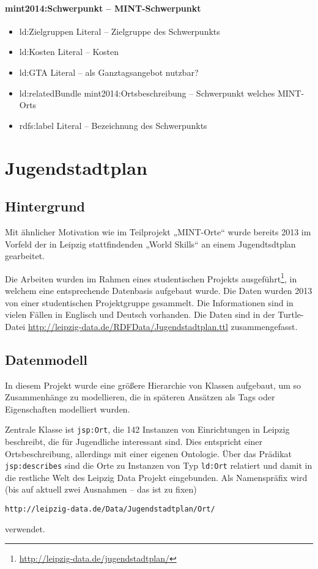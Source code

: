 \documentclass[a4paper,11pt]{article}
\begin{document}
\paragraph{mint2014:Schwerpunkt – MINT-Schwerpunkt}
\begin{itemize}\itemsep0pt
\item ld:Zielgruppen Literal – Zielgruppe des Schwerpunkts
\item ld:Kosten Literal – Kosten
\item ld:GTA Literal – als Ganztagsangebot nutzbar?
\item ld:relatedBundle mint2014:Ortsbeschreibung – Schwerpunkt welches
  MINT-Orts
\item rdfs:label Literal – Bezeichnung des Schwerpunkts
\end{itemize}
\newpage

\section{Jugendstadtplan}

\subsection{Hintergrund}
Mit ähnlicher Motivation wie im Teilprojekt „MINT-Orte“ wurde bereits 2013 im
Vorfeld der in Leipzig stattfindenden „World Skills“ an einem Jugendtsdtplan
gearbeitet. 

Die Arbeiten wurden im Rahmen eines studentischen Projekts
ausgeführt\footnote{\url{http://leipzig-data.de/jugendstadtplan/}}, in welchem
eine entsprechende Datenbasis aufgebaut wurde. Die Daten wurden 2013 von einer
studentischen Projektgruppe gesammelt. Die Informationen sind in vielen Fällen
in Englisch und Deutsch vorhanden. Die Daten sind in der
Turtle-Datei \url{http://leipzig-data.de/RDFData/Jugendstadtplan.ttl}
zusammengefasst.

\subsection{Datenmodell}
In diesem Projekt wurde eine größere Hierarchie von Klassen aufgebaut, um so
Zusammenhänge zu modellieren, die in späteren Ansätzen als Tags oder
Eigenschaften modelliert wurden.

Zentrale Klasse ist \texttt{jsp:Ort}, die 142 Instanzen von Einrichtungen in
Leipzig beschreibt, die für Jugendliche interessant sind.  Dies entspricht
einer Ortsbeschreibung, allerdings mit einer eigenen Ontologie. Über das
Prädikat \texttt{jsp:describes} sind die Orte zu Instanzen von Typ
\texttt{ld:Ort} relatiert und damit in die restliche Welt des Leipzig Data
Projekt eingebunden.  Als Namenspräfix wird (bis auf aktuell zwei Ausnahmen --
das ist zu fixen) 
\begin{center}
  \texttt{http://leipzig-data.de/Data/Jugendstadtplan/Ort/}
\end{center}
verwendet.
\end{document}
